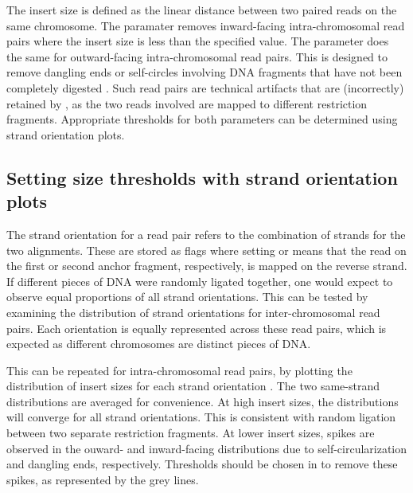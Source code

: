 \documentclass{report}\usepackage[]{graphicx}\usepackage[usenames,dvipsnames]{color}
\newcommand{\hlopt}[1]{\textcolor[rgb]{0,0,0}{#1}}%
\newcommand{\hlstd}[1]{\textcolor[rgb]{0.251,0.251,0.251}{#1}}%
\newcommand{\hlkwb}[1]{\textcolor[rgb]{0,0,0}{#1}}%
\newcommand{\hlkwd}[1]{\textcolor[rgb]{0.878,0.439,0.125}{#1}}%
\newenvironment{knitrout}{}{} %
\begin{document}
The insert size is defined as the linear distance between two paired reads on the same chromosome.
The  paramater removes inward-facing intra-chromosomal read pairs where the insert size is less than the specified value.
The  parameter does the same for outward-facing intra-chromosomal read pairs.
This is designed to remove dangling ends or self-circles involving DNA fragments that have not been completely digested \cite{jin2013highres}.
Such read pairs are technical artifacts that are (incorrectly) retained by , as the two reads involved are mapped to different restriction fragments.
Appropriate thresholds for both parameters can be determined using strand orientation plots.

\subsection{Setting size thresholds with strand orientation plots}
\label{sec:strorient}
The strand orientation for a read pair refers to the combination of strands for the two alignments.
These are stored as flags where setting  or  means that the read on the first or second anchor fragment, respectively, is mapped on the reverse strand.
If different pieces of DNA were randomly ligated together, one would expect to observe equal proportions of all strand orientations. 
This can be tested by examining the distribution of strand orientations for inter-chromosomal read pairs.
Each orientation is equally represented across these read pairs, which is expected as different chromosomes are distinct pieces of DNA.

\begin{knitrout}
\color{fgcolor}
\end{knitrout}

This can be repeated for intra-chromosomal read pairs, by plotting the distribution of insert sizes for each strand orientation \cite{jin2013highres}.
The two same-strand distributions are averaged for convenience.
At high insert sizes, the distributions will converge for all strand orientations.
This is consistent with random ligation between two separate restriction fragments.
At lower insert sizes, spikes are observed in the ouward- and inward-facing distributions due to self-circularization and dangling ends, respectively.
Thresholds should be chosen in  to remove these spikes, as represented by the grey lines.
\end{document}
